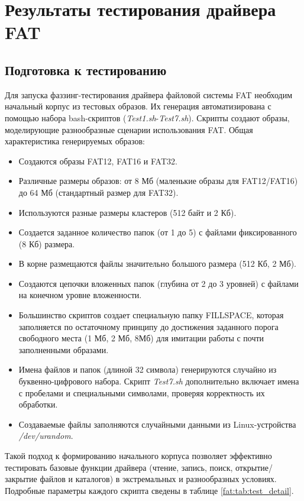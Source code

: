 \section{Результаты тестирования драйвера FAT}

\subsection{Подготовка к тестированию}
Для запуска фаззинг-тестирования драйвера файловой системы FAT необходим начальный корпус из тестовых образов. Их генерация автоматизирована с помощью набора bash-скриптов (\textit{Test1.sh}-\textit{Test7.sh}). Скрипты создают образы, моделирующие разнообразные сценарии использования FAT.  Общая характеристика генерируемых образов:
\begin{itemize}
	\item Создаются образы FAT12, FAT16 и FAT32.
	\item Различные размеры образов: от 8 Мб (маленькие образы для FAT12/FAT16) до 64 Мб (стандартный размер для FAT32).
	\item Используются разные размеры кластеров (512 байт и 2 Кб).
	\item Создается заданное количество папок (от 1 до 5) с файлами фиксированного (8 Кб) размера.
	\item В корне размещаются файлы значительно большого размера (512 Кб, 2 Мб).
	\item Создаются цепочки вложенных папок (глубина от 2 до 3 уровней) с файлами на конечном уровне вложенности.
	\item Большинство скриптов создает специальную папку FILLSPACE, которая заполняется по остаточному принципу до достижения заданного порога свободного места (1 Мб, 2 Мб, 8Мб) для имитации работы с почти заполненными образами.
	\item Имена файлов и папок (длиной 32 символа) генерируются случайно из буквенно-цифрового набора. Скрипт \textit{Test7.sh} дополнительно включает имена с пробелами и специальными символами, проверяя корректность их обработки.
	\item Создаваемые файлы заполняются случайными данными из Linux-устройства \textit{/dev/urandom}.
\end{itemize} 
Такой подход к формированию начального корпуса позволяет эффективно тестировать базовые функции драйвера (чтение, запись, поиск, открытие/закрытие файлов и каталогов) в экстремальных и разнообразных условиях. Подробные параметры каждого скрипта сведены в таблице \ref{fat:tab:test_detail}.
